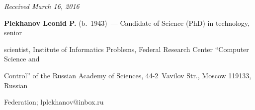 







\vspace*{-1pt}





\hfill{\small\textit{Received March 16, 2016}}


  








\Contrl





\noindent


\textbf{Plekhanov Leonid P.} (b.\ 1943)~--- Candidate of Science (PhD) in technology, senior 


scientist, Institute of Informatics Problems, Federal Research Center ``Computer Science and 


Control'' of the Russian Academy of Sciences, 44-2~Vavilov Str., Moscow 119133, Russian 


Federation; lplekhanov@inbox.ru 





\label{end\stat}








\renewcommand{\bibname}{\protect\rm Литература}





       


